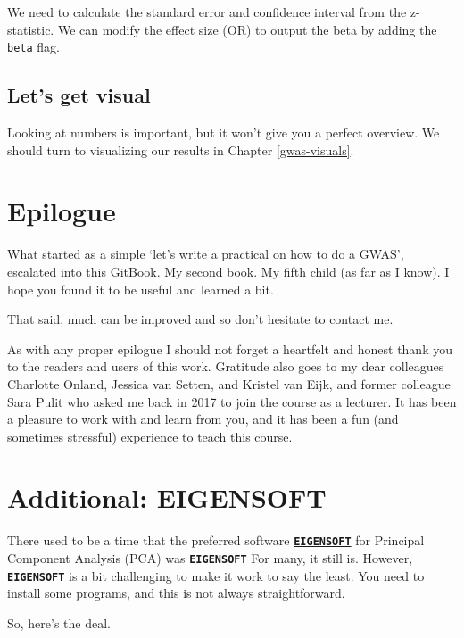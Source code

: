 \documentclass[
]{book}
\newcommand{\passthrough}[1]{#1}
\begin{document}
We need to calculate the standard error and confidence interval from the z-statistic. We can modify the effect size (OR) to output the beta by adding the \passthrough{\lstinline!beta!} flag.

\hypertarget{lets-get-visual}{%
\section{Let's get visual}\label{lets-get-visual}}

Looking at numbers is important, but it won't give you a perfect overview. We should turn to visualizing our results in Chapter \ref{gwas-visuals}.

\hypertarget{epilogue}{%
\chapter{Epilogue}\label{epilogue}}

What started as a simple `let's write a practical on how to do a GWAS', escalated into this GitBook. My second book. My fifth child (as far as I know). I hope you found it to be useful and learned a bit.

That said, much can be improved and so don't hesitate to contact me.

As with any proper epilogue I should not forget a heartfelt and honest thank you to the readers and users of this work. Gratitude also goes to my dear colleagues Charlotte Onland, Jessica van Setten, and Kristel van Eijk, and former colleague Sara Pulit who asked me back in 2017 to join the course as a lecturer. It has been a pleasure to work with and learn from you, and it has been a fun (and sometimes stressful) experience to teach this course.

\hypertarget{eigensoft}{%
\chapter{Additional: EIGENSOFT}\label{eigensoft}}

There used to be a time that the preferred software \textbf{\href{https://github.com/DReichLab/EIG}{\passthrough{\lstinline!EIGENSOFT!}}} for Principal Component Analysis (PCA) was \textbf{\passthrough{\lstinline!EIGENSOFT!}} For many, it still is. However, \textbf{\passthrough{\lstinline!EIGENSOFT!}} is a bit challenging to make it work to say the least. You need to install some programs, and this is not always straightforward.

So, here's the deal.
\end{document}
